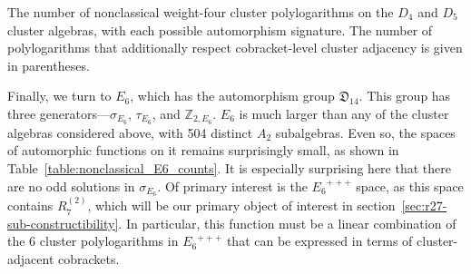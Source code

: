 \documentclass[11pt]{article}
\begin{document}
\begin{table}
\caption{The number of nonclassical weight-four cluster polylogarithms on the $D_4$ and $D_5$ cluster algebras, with each possible automorphism signature. The number of polylogarithms that additionally respect cobracket-level cluster adjacency is given in parentheses.}
\label{table:nonclassical_Dn_counts}
\end{table}


Finally, we turn to $E_6$, which has the automorphism group ${\mathfrak D}_{14}$. This group has three generators---$\sigma_{E_6}$, $\tau_{E_6}$, and $\mathbb{Z}_{2,E_6}$. $E_6$ is much larger than any of the cluster algebras considered above, with 504 distinct $A_2$ subalgebras. Even so, the spaces of automorphic functions on it remains surprisingly small, as shown in Table~\ref{table:nonclassical_E6_counts}. It is especially surprising here that there are no odd solutions in $\sigma_{E_6}$. Of primary interest is the ${E_6}^{+++}$ space, as this space contains $R^{(2)}_7$, which will be our primary object of interest in section~\ref{sec:r27-sub-constructibility}. In particular, this function must be a linear combination of the 6 cluster polylogarithms in ${E_6}^{+++}$ that can be expressed in terms of cluster-adjacent cobrackets. 
\end{document}

